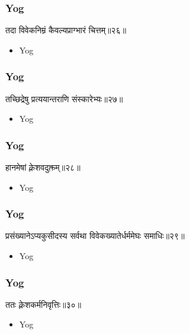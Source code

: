 \begin{frame}[fragile]\frametitle{Yog}
\begin{sanskrit}
तदा विवेकनिम्नं कैवल्यप्राग्भारं चित्तम्॥२६॥
\end{sanskrit}
	\begin{itemize}
	\item Yog 
	\end{itemize}
\end{frame}


\begin{frame}[fragile]\frametitle{Yog}
\begin{sanskrit}
तच्छिद्रेषु प्रत्ययान्तराणि संस्कारेभ्यः॥२७॥
\end{sanskrit}
	\begin{itemize}
	\item Yog 
	\end{itemize}
\end{frame}



\begin{frame}[fragile]\frametitle{Yog}
\begin{sanskrit}
हानमेषां क्लेशवदुक्तम्॥२८॥
\end{sanskrit}
	\begin{itemize}
	\item Yog 
	\end{itemize}
\end{frame}

\begin{frame}[fragile]\frametitle{Yog}
\begin{sanskrit}
प्रसंख्यानेऽप्यकुसीदस्य सर्वथा विवेकख्यातेर्धर्ममेघः समाधिः॥२९॥
\end{sanskrit}
	\begin{itemize}
	\item Yog 
	\end{itemize}
\end{frame}


\begin{frame}[fragile]\frametitle{Yog}
\begin{sanskrit}
ततः क्लेशकर्मनिवृत्तिः॥३०॥
\end{sanskrit}
	\begin{itemize}
	\item Yog 
	\end{itemize}
\end{frame}


